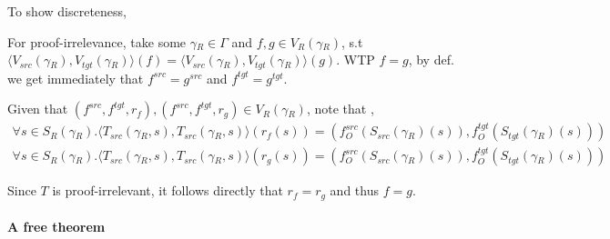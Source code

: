 \documentclass[12pt,a4paper]{article}
\def\src{_{src}}\alwaysmath{src}
\def\rfl{_{refl}}\alwaysmath{rfl}
\def\tgt{_{tgt}}\alwaysmath{tgt}
\renewcommand{\O}{_{O}}
\newcommand{\R}{\ensuremath{_{R}}}
\begin{document}
To show discreteness, 

For proof-irrelevance, take some $\gamma\R \in \Gamma$ and $f , g \in V\R(\gamma\R)$, s.t $\langle V\src(\gamma\R), V\tgt(\gamma\R) \rangle (f) = \langle V\src(\gamma\R), V\tgt(\gamma\R) \rangle (g)$. WTP $f = g$, by def. we get immediately that $f^{src} = g^{src}$ and $f^{tgt} = g^{tgt}$. 

Given that $(f^{src}, f^{tgt}, r_f), (f^{src}, f^{tgt}, r_g) \in V\R(\gamma\R)$, note that , 
\begin{align*}
  \forall s \in S\R(\gamma\R). \langle T\src(\gamma\R, s), T\src(\gamma\R, s) \rangle  ( r_f(s)) = (f\O^{src}(S\src(\gamma\R)(s)), f\O^{tgt}(S\tgt(\gamma\R)(s)))\\
  \forall s \in S\R(\gamma\R). \langle T\src(\gamma\R, s), T\src(\gamma\R, s) \rangle  ( r_g(s)) = (f\O^{src}(S\src(\gamma\R)(s)), f\O^{tgt}(S\tgt(\gamma\R)(s)))
\end{align*}

Since $T$ is proof-irrelevant, it follows directly that $r_f = r_g$ and thus $f = g$. 

\paragraph{A free theorem}
%
\end{document}
